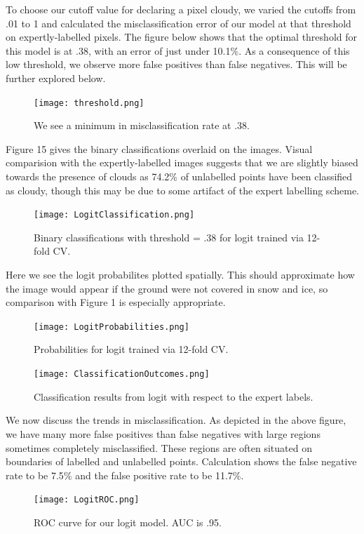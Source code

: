 \documentclass{article}\usepackage[]{graphicx}\usepackage[]{color}
\begin{document}
To choose our cutoff value for declaring a pixel cloudy, we varied the cutoffs from .01 to 1 and calculated the misclassification error of our model at that threshold on expertly-labelled pixels. The figure below shows that the optimal threshold for this model is at .38, with an error of just under 10.1$\%$. As a consequence of this low threshold, we observe more false positives than false negatives. This will be further explored below.

\begin{figure}[H]
\begin{center}
\texttt{[image: threshold.png]}
\caption{We see a minimum in misclassification rate at .38.}
\end{center}
\end{figure}

Figure 15 gives the binary classifications overlaid on the images. Visual comparision with the expertly-labelled images suggests that we are slightly biased towards the presence of clouds as 74.2$\%$ of unlabelled points have been classified as cloudy, though this may be due to some artifact of the expert labelling scheme.
\begin{figure}[H]
\texttt{[image: LogitClassification.png]}
\caption{Binary classifications with threshold = .38 for logit trained via 12-fold CV.}
\end{figure}

Here we see the logit probabilites plotted spatially. This should approximate how the image would appear if the ground were not covered in snow and ice, so comparison with Figure 1 is especially appropriate. 
\begin{figure}[H]
\texttt{[image: LogitProbabilities.png]}
\caption{Probabilities for logit trained via 12-fold CV.}
\end{figure}

\begin{figure}[H]
\texttt{[image: ClassificationOutcomes.png]}
\caption{Classification results from logit with respect to the expert labels.}
\end{figure}

We now discuss the trends in misclassification. As depicted in the above figure, we have many more false positives than false negatives with large regions sometimes completely misclassified. These regions are often situated on boundaries of labelled and unlabelled points. Calculation shows the false negative rate to be 7.5$\%$ and the false positive rate to be 11.7$\%$. 

\begin{figure}[H]
\begin{center}
\texttt{[image: LogitROC.png]}
\caption{ROC curve for our logit model. AUC is .95.}
\end{center}
\end{figure}
\end{document}
